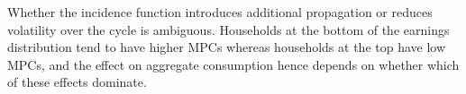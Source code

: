 Whether the incidence function introduces additional propagation or reduces volatility over the cycle is ambiguous. Households at the bottom of the earnings distribution tend to have higher MPCs whereas households at the top have low MPCs, and the effect on aggregate consumption hence depends on whether which of these effects dominate.  



